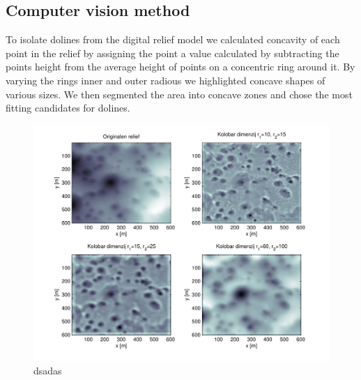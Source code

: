 \documentclass[a0,portrait]{a0poster}
\begin{document}
\begin{multicols}{2}
\section*{Computer vision method}

To isolate dolines from the digital relief model we calculated concavity of each point in the relief by assigning the point a value calculated by subtracting the points height from the average height of points on a concentric ring around it. By varying the rings inner and outer radious we highlighted concave shapes of various sizes.
We then segmented the area into concave zones and chose the most fitting candidates for dolines.

	\begin{minipage}[b]{0.5\textwidth}
	\centering
      \begin{minipage}{0.45\linewidth}
      \centering
          \begin{figure}[H]
              \includegraphics[width=\textwidth]{concavity-samples.pdf}
              \caption{dsadas}
              \label{fig:concavity-samples}
          \end{figure}
      \end{minipage}
      \hspace{0.05\linewidth}
      \begin{minipage}{0.45\linewidth}
      \centering
          \begin{figure}[H]

\end{figure}
\end{minipage}
\end{minipage}
\end{multicols}
\end{document}
